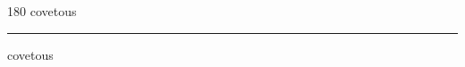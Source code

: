 
\begin{frame}
\begin{center}
\begin{turn}{180}
{\fontsize{2.5cm}{1em}\selectfont covetous}
\end{turn}
\vspace{1em}\par  
\hrule
\vspace{1em}\par  
{\fontsize{2.5cm}{1em}\selectfont covetous}
\end{center}
\end{frame}
